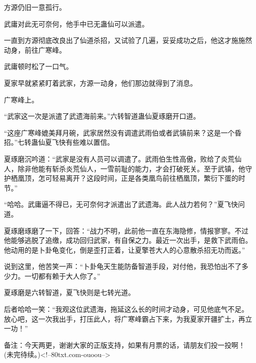 \begin{this_body}
方源仍旧一意孤行。

武庸对此无可奈何，他手中已无蛊仙可以派遣。

一直到方源彻底改良出了仙道杀招，又试验了几遍，妥妥成功之后，他这才施施然动身，前往广寒峰。

武庸顿时松了一口气。

夏家早就紧紧盯着武家，方源一动身，他们那边就得到了消息。

广寒峰上。

“武家这一次是派遣了武遗海前来。”六转智道蛊仙夏琢磨开口道。

“这座广寒峰媲美拜月碗，武家居然没有调遣武雨伯或者武镇前来？这是一个昏招。”七转蛊仙夏飞快有些难以置信。

夏琢磨沉吟道：“武家是没有人员可以调遣了。武雨伯生性高傲，败给了炎荒仙人，除非他能有斩杀炎荒仙人，一雪前耻的能力，才会打破死关。至于武镇，他守护栖凰顶，怎可轻易离开？这段时间，正是各类凰鸟前往栖凰顶，繁衍下蛋的时节。”

“哈哈。武庸逼不得已，无可奈何才派遣出了武遗海。此人战力若何？”夏飞快问道。

夏琢磨琢磨了一下，回答：“战力不明，此前他一直在东海隐修，情报寥寥。不过他能够逃脱了追缴，成功回归武家，有自保之力。最近一次出手，是救下武雨伯。他动用的是卜卦龟变化，倒是歪打正着，让夏擎苍大人的心意散杀招无功而返。”

说到这里，他苦笑一声：“卜卦龟天生能防备智道手段，对付他，我恐怕出不了多少力。一切都有赖于大人你了。”

夏琢磨是六转智道，夏飞快则是七转光道。

后者哈哈一笑：“我观这位武遗海，拖延这么长的时间才动身，可见他底气不足。放心吧，这一次我出手，打压此人，将广寒峰霸占下来，为我夏家开疆扩土，再立一功！”

备注：今天两更，谢谢大家的正版支持，如果有月票的话，请朋友们投一投啊！(未完待续。)<!--80txt.com-ouoou-->

\end{this_body}

